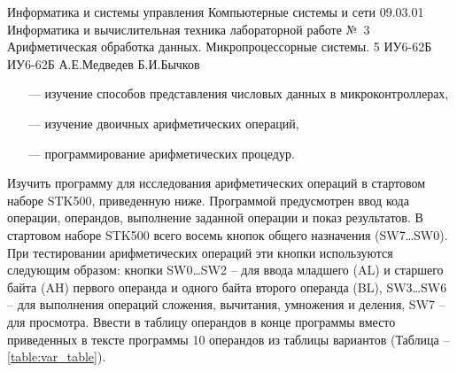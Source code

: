 \documentclass{bmstu}
\begin{document}


\makeatletter %
\renewcommand\chapter{\par%
\thispagestyle{plain}%
\@afterindentfalse \secdef\@chapter\@schapter}
\makeatother

\def\numberWork{1}


\makereporttitle
    {Информатика и системы управления} %
    {Компьютерные системы и сети} %
    {09.03.01 Информатика и вычислительная техника} %
    {лабораторной работе №~3} %
    {Арифметическая обработка данных.} %
    {Микропроцессорные системы.} %
    {5} %
    {ИУ6-62Б} %
    {
    	{ИУ6-62Б}
    	{А.Е.Медведев} %
    	{Б.И.Бычков} %
    } 

\chapter{Цель работы:}
\begin{enumerate}
\item[---] изучение способов представления числовых данных в микроконтроллерах, 
\item[---] изучение двоичных арифметических операций, 
\item[---] программирование арифметических процедур.
\end{enumerate}

\chapter{Задание 1. }

Изучить программу для исследования арифметических операций в стартовом наборе STK500, приведенную ниже.
Программой предусмотрен ввод кода операции, операндов, выполнение заданной операции и показ результатов.
В стартовом наборе STK500 всего восемь кнопок общего назначения (SW7…SW0). При тестировании арифметических операций эти кнопки используются следующим образом: кнопки SW0…SW2 – для ввода младшего (AL) и старшего байта (AH) первого операнда и одного байта второго операнда (BL), SW3…SW6 – для выполнения операций сложения, вычитания, умножения и деления, SW7 – для просмотра.
Ввести в таблицу операндов в конце программы вместо приведенных в тексте программы 10 операндов из таблицы вариантов (Таблица -- \ref{table:var_table}).
\end{document}
